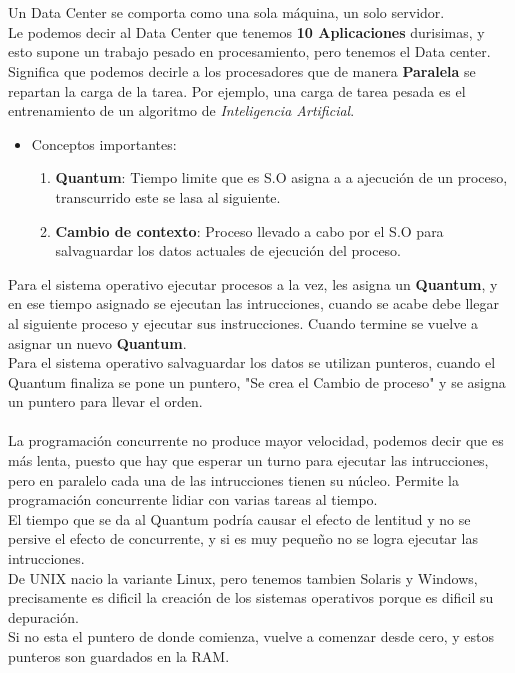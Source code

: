 \documentclass[a4paper]{report} %
\begin{document}
           \\\\Un Data Center se comporta como una sola máquina, un solo servidor.
           \\Le podemos decir al Data Center que tenemos \textbf{10 Aplicaciones} durisimas, y esto supone un trabajo pesado en procesamiento, pero tenemos el Data center.
           \\Significa que podemos decirle a los procesadores que de manera \textbf{Paralela} se repartan la carga de la tarea. Por ejemplo, una carga de tarea pesada es el entrenamiento de un algoritmo de \textit{Inteligencia Artificial}.
           \begin{itemize}
             \item Conceptos importantes:
               \begin{enumerate}
                 \item \textbf{Quantum}: Tiempo limite que es S.O asigna a a ajecución de un proceso, transcurrido este se lasa al siguiente.
                 \item \textbf{Cambio de contexto}: Proceso llevado a cabo por el S.O para salvaguardar los datos actuales de ejecución del proceso.
               \end{enumerate}
           \end{itemize}
          Para el sistema operativo ejecutar procesos a la vez, les asigna un \textbf{Quantum}, y en ese tiempo asignado se ejecutan las intrucciones, cuando se acabe debe llegar al siguiente proceso y ejecutar sus instrucciones. Cuando termine se vuelve a asignar un nuevo \textbf{Quantum}.
          \\Para el sistema operativo salvaguardar los datos se utilizan punteros, cuando el Quantum finaliza se pone un puntero, "Se crea el Cambio de proceso" y se asigna un puntero para llevar el orden.
          \\\\La programación concurrente no produce mayor velocidad, podemos decir que es más lenta, puesto que hay que esperar un turno para ejecutar las intrucciones, pero en paralelo cada una de las intrucciones tienen su núcleo. Permite la programación concurrente lidiar con varias tareas al tiempo.
          \\El tiempo que se da al Quantum podría causar el efecto de lentitud y no se persive el efecto de concurrente, y si es muy pequeño no se logra ejecutar las intrucciones.
          \\De UNIX nacio la variante Linux, pero tenemos tambien Solaris y Windows, precisamente es dificil la creación de los sistemas operativos porque es dificil su depuración.
          \\Si no esta el puntero de donde comienza, vuelve a comenzar desde cero, y estos punteros son guardados en la RAM.
\end{document}
